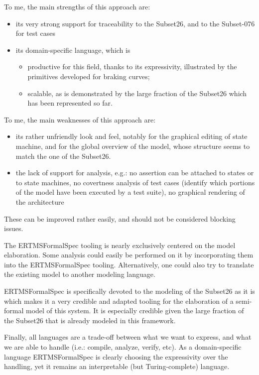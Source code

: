 \begin{assessor1}
To me, the main strengths of this approach are: 
\begin{itemize}
\item its very strong support for traceability to the Subset26, and to the Subset-076 for test cases
\item its domain-specific language, which is
\begin{itemize}
\item productive for this field, thanks to its expressivity, illustrated by the primitives developed for braking curves; 
\item scalable, as is demonstrated by the large fraction of the Subset26 which has been represented so far. 
\end{itemize}
\end{itemize}

To me, the main weaknesses of this approach are: 
\begin{itemize}
\item its rather unfriendly look and feel, notably for the graphical editing of state machine, and for the global overview of the model, whose structure seems to match the one of the Subset26. 
\item the lack of support for analysis, e.g.: no assertion can be attached to states or to state machines, no covertness analysis of test cases (identify which portions of the model have been executed by a test suite), no graphical rendering of the architecture
\end{itemize}
These can be improved rather easily, and should not be considered blocking issues. 

The ERTMSFormalSpec tooling is nearly exclusively centered on the model elaboration. Some analysis could easily be performed on it by incorporating them into the ERTMSFormalSpec tooling. Alternatively, one could also try to translate the existing model to another modeling language. 

ERTMSFormalSpec is specifically devoted to the modeling of the Subset26 as it is which makes it a very credible and adapted tooling for the elaboration of a semi-formal model of this system. It is especially credible given the large fraction of the Subset26 that is already modeled in this framework. 

Finally, all languages are a trade-off between what we want to express, and what we are able to handle (i.e.: compile, analyze, verify, etc). As a domain-specific language ERTMSFormalSpec is clearly choosing the expressivity over the handling, yet it remains an interpretable (but Turing-complete) language.
\end{assessor1}

